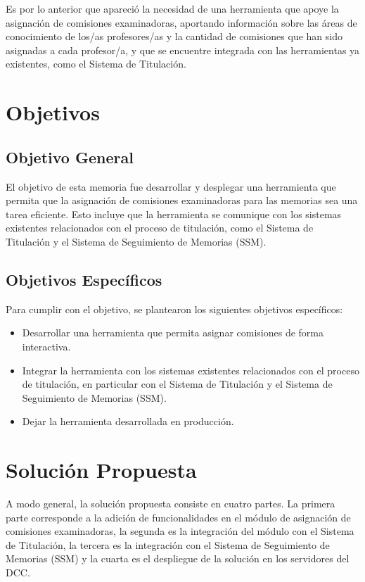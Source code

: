 Es por lo anterior que apareció la necesidad de una herramienta que apoye la
asignación de comisiones examinadoras, aportando información sobre las áreas de
conocimiento de los/as profesores/as y la cantidad de comisiones que han sido asignadas
a cada profesor/a, y que se encuentre integrada con las herramientas ya existentes, como
el Sistema de Titulación.

\section{Objetivos}\label{sec:intro:objetivos}

\subsection{Objetivo General}
El objetivo de esta memoria fue desarrollar y desplegar una herramienta que permita que la
asignación de comisiones examinadoras para las memorias sea una tarea eficiente.
Esto incluye que la herramienta se comunique con los sistemas existentes relacionados con
el proceso de titulación, como el Sistema de Titulación y el Sistema de Seguimiento de
Memorias (SSM).

\subsection{Objetivos Específicos}
Para cumplir con el objetivo, se plantearon los siguientes objetivos específicos:
\begin{itemize}
  \item Desarrollar una herramienta que permita asignar comisiones de forma interactiva.
  \item Integrar la herramienta con los sistemas existentes relacionados con el proceso de
        titulación, en particular con el Sistema de Titulación y el Sistema de Seguimiento
        de Memorias (SSM).
  \item Dejar la herramienta desarrollada en producción.
\end{itemize}

\section{Solución Propuesta}
A modo general, la solución propuesta consiste en cuatro partes. La primera parte
corresponde a la adición de funcionalidades en el módulo de asignación de comisiones
examinadoras, la segunda es la integración del módulo con el Sistema de Titulación, la
tercera es la integración con el Sistema de Seguimiento de Memorias (SSM) y la cuarta es
el despliegue de la solución en los servidores del DCC.

